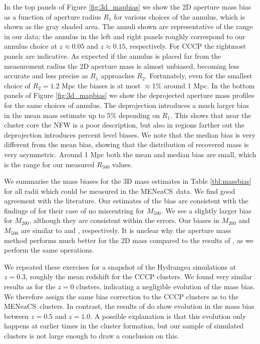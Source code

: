 \documentclass[useAMS,usenatbib]{mnras}
\newcommand{\mn}{MENeaCS}
\begin{document}
In the top panels of Figure \ref{fig:3d_mapbias} we show the 2D aperture mass bias as a function of aperture radius $R_1$ for various choices of the annulus, which is shown as the gray shaded area. The annuli shown are representative of the range in our data; the annulus in the left and right panels roughly correspond to our annulus choice at $z\approx0.05$ and $z\approx0.15$, respectively. For CCCP the rightmost panels are indicative. As expected if the annulus is placed far from the measurement radius the 2D aperture mass is almost unbiased, becoming less accurate and less precise as $R_1$ approaches $R_2$. Fortunately, even for the smallest choice of $R_2=1.2$ Mpc the biases is at most $\approx$1\% around 1 Mpc. In the bottom panels of Figure \ref{fig:3d_mapbias} we show the deprojected aperture mass profiles for the same choices of annulus. The deprojection introduces a much larger bias in the mean mass estimate up to 5\% depending on $R_1$. This shows that near the cluster core the NFW is a poor description, but also in regions farther out the deprojection  introduces percent level biases. 
We note that the median bias is very different from the mean bias, showing that the distribution of recovered mass is very asymmetric.
Around 1 Mpc both the mean and median bias are small, which is the range for our measured $R_{500}$ values.


We summarise the mass biases for the 3D mass estimates in Table \ref{tbl:massbias} for all radii which could be measured in the \mn \ data. We find good agreement with the literature. Our estimates of the bias are consistent with the findings of \citet{schrabback18} for their case of no miscentring for $M_{500}$. We see a slightly larger bias for $M_{200}$, although they are consistent within the errors. Our biases in $M_{200}$ and $M_{500}$ are similar to \citet{henson17} and \citet{becker11}, respectively. It is unclear why the aperture mass method performs much better for the 2D mass compared to the results of \citet{meneghetti10}, as we perform the same operations. 


We repeated these exercises for a snapshot of the Hydrangea simulations at $z=0.3$, roughly the mean redshift for the CCCP clusters. We found very similar results as for the $z=0$ clusters, indicating a negligible evolution of the mass bias. We therefore assign the same bias correction to the CCCP clusters as to the \mn \ clusters. In contrast, the results of \citet{schrabback18} do show evolution in the mass bias between  $z=0.5$ and $z=1.0$. A possible explanation is that this evolution only happens at earlier times in the cluster formation, but our sample of simulated clusters is not large enough to draw a conclusion on this. 
\end{document}
